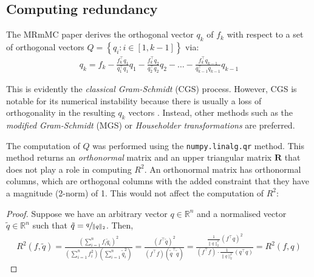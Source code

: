 \documentclass[12pt, twoside, a4paper]{report}
\begin{document}
\subsection{Computing redundancy} \label{mrmmc:redundancy:computation}

The MRmMC paper \cite{RefWorks:187} derives the orthogonal vector $q_k$ of $f_k$ with respect to a set of orthogonal vectors $Q = \left\lbrace q_i: i \in [1, k-1] \right\rbrace$ via:
\begin{align*}
q_k = f_k  - \frac{f_k^\top q_1}{q_1^\top q_1}q_1  - \frac{f_k^\top q_2}{q_2^\top q_2}q_2 - \dots - \frac{f_k^\top q_{k-1}}{q_{k-1}^\top q_{k-1}}q_{k-1}
\end{align*}

This is evidently the \textit{classical Gram-Schmidt} (CGS) process. However, CGS is notable for its numerical instability because there is usually a loss of orthogonality in the resulting $q_k$ vectors \cite{RefWorks:195}. Instead, other methods such as the \textit{modified Gram-Schmidt} (MGS) or \textit{Householder transformations} are preferred.


The computation of $Q$ was performed using the \texttt{numpy.linalg.qr} method. This method returns an \textit{orthonormal} matrix and an upper triangular matrix $\boldsymbol R$ that does not play a role in computing $R^2$. An orthonormal matrix has orthonormal columns, which are orthogonal columns with the added constraint that they have a magnitude (2-norm) of 1. This would not affect the computation of $R^2$:


\begin{proof}
Suppose we have an arbitrary vector $q \in \mathbb{R}^n$ and a normalised vector $\tilde{q} \in \mathbb{R}^n$ such that $\tilde{q} = \sfrac{q}{\| q \|_2}$. Then,
\begin{align*}
R^2(f, \tilde{q}) = \frac{\left( \sum_{i=1}^n f_i \tilde{q}_i \right)^2}{\left(\sum_{i=1}^n f_i^2 \right) \left( \sum_{i=1}^n \tilde{q}_i^2 \right)}
= \frac{\left( f^\top \tilde{q} \right)^2}{(f^\top f)(\tilde{q}^\top \tilde{q})}
= \frac{\frac{1}{\| q \|^2_2} \left( f^\top q \right)^2}{(f^\top f) \cdot \frac{1}{\| q \|^2_2} \left( q^\top q \right)} = R^2(f, q)
\end{align*}
\end{proof}
\end{document}
